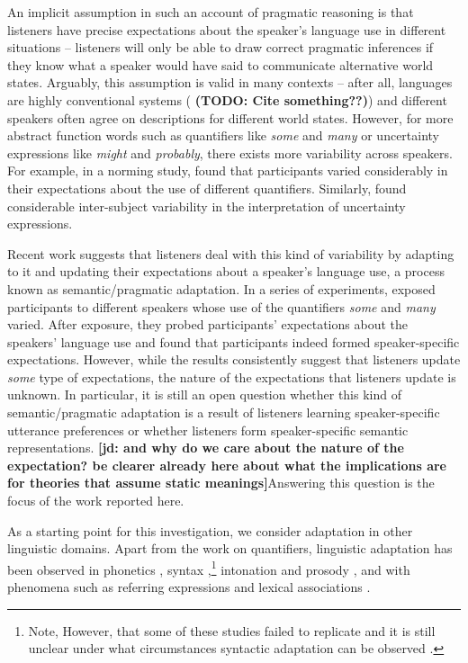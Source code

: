 \documentclass[lucida,biblatex]{sp} %
\newcommand{\jd}[1]{\textcolor{PinkyPurple}{\textbf{[jd: #1]}}}
\newcommand{\todo}[1]{}
\renewcommand{\todo}[1]{{\bf \color{red} (TODO: {#1})}}
\begin{document}
An implicit assumption in such an account of pragmatic reasoning is that listeners have precise expectations about the speaker's language use in different situations -- listeners will only be able to draw correct pragmatic inferences if they know what a speaker would have said to communicate alternative world states. Arguably, this assumption is valid in many contexts -- after all, languages are highly conventional systems (\todo{Cite something??}) and different speakers  often agree on descriptions for different world states. However, for more abstract function words such as quantifiers like \textit{some} and \textit{many} or uncertainty expressions like \textit{might} and \textit{probably}, there exists more variability across speakers. For example, in a norming study, \citet{Yildirim2016} found that participants varied considerably in their expectations about the use of different quantifiers. Similarly, \citet{Wallsten1986} found considerable inter-subject variability in the interpretation of uncertainty expressions. 

Recent work suggests that listeners deal with this kind of variability by adapting to it and updating their expectations about a speaker's language use, a process known as semantic/pragmatic adaptation. In a series of experiments, \citet{Yildirim2016} exposed participants to different speakers whose use of the quantifiers \textit{some} and \textit{many} varied. After exposure, they probed participants' expectations about the speakers' language use and found that participants indeed formed speaker-specific expectations. However, while the results consistently suggest that listeners update \textit{some} type of expectations, the nature of the expectations that listeners update is unknown. 
In particular, it is still an open question whether this kind of semantic/pragmatic adaptation is a result of listeners learning speaker-specific utterance preferences or whether listeners form speaker-specific semantic representations. 
\jd{and why do we care about the nature of the expectation? be clearer already here about what the implications are for theories that assume static meanings}Answering this question is the focus of the work reported here.

As a starting point for this investigation, we consider adaptation in other linguistic domains. Apart from the work on quantifiers, linguistic adaptation has been observed in  phonetics \citep[e.g.,][]{Goldinger1998,Norris2003,Kraljic2005,Kraljic2007,Babel2012,Kleinschmidt2015}, 
syntax \citep{Kamide2012,Fine2013,Fine2016,Myslin2016,Kroczek2017},\footnote{Note, 
However, that some of these studies failed to replicate and it is still unclear under what 
circumstances syntactic adaptation can be observed \citep[see ][]{Liu2017,HarringtonStack2018}.} intonation and prosody \citep{Kurumada2012,Roettger2019}, and with phenomena such as referring expressions
\citep{Clark1986,Brennan1996,Metzing2003,Horton2005,Brennan2009} and lexical associations \citep{DelaneyBusch2019}. 
\end{document}

